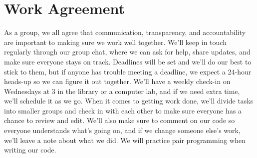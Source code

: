 \documentclass[manuscript,authorversion,nonacm]{acmart} %
\begin{document}
\section{Work Agreement}

As a group, we all agree that communication, transparency, and accountability are important to making sure we work well together. We'll keep in touch regularly through our group chat, where we can ask for help, share updates, and make sure everyone stays on track. Deadlines will be set and we'll do our best to stick to them, but if anyone has trouble meeting a deadline, we expect a 24-hour heads-up so we can figure it out together. We'll have a weekly check-in on Wednesdays at 3 in the library or a computer lab, and if we need extra time, we'll schedule it as we go. When it comes to getting work done, we'll divide tasks into smaller groups and check in with each other to make sure everyone has a chance to review and edit. We'll also make sure to comment on our code so everyone understands what's going on, and if we change someone else's work, we'll leave a note about what we did. We will practice pair programming when writing our code. 

\newpage




\newpage 
\appendix
\end{document}
